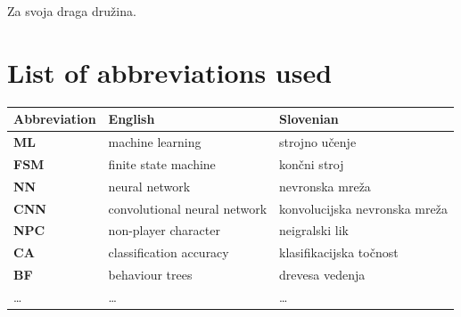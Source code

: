 \documentclass[a4paper, 12pt]{book}
\newcommand{\clearemptydoublepage}{\newpage{\pagestyle{empty}\cleardoublepage}}
\begin{document}
\thispagestyle{empty}\mbox{}{\textheight}\mbox{}\hfill\begin{minipage}{0.55\textwidth}%
Za svoja draga družina.
\normalfont\end{minipage}

\clearemptydoublepage


\pagestyle{empty}
\def\thepage{}%
\tableofcontents{}


\clearemptydoublepage



\chapter*{List of abbreviations used}  %

\noindent\begin{tabular}{p{}|p{}|p{}}    %
  {\bf Abbreviation} & {\bf English} & {\bf Slovenian} \\ \hline
  {\bf ML}      & machine learning                  & strojno učenje \\
  {\bf FSM}     & finite state machine              & končni stroj \\
  {\bf NN}      & neural network                    & nevronska mreža \\
  {\bf CNN}     & convolutional neural network      & konvolucijska nevronska mreža \\
  {\bf NPC}     & non-player character              & neigralski lik \\
  {\bf CA}      & classification accuracy           & klasifikacijska točnost \\
  {\bf BF }     & behaviour trees                   & drevesa vedenja \\
  \dots         & \dots                             & \dots \\
\end{tabular}
\end{document}
